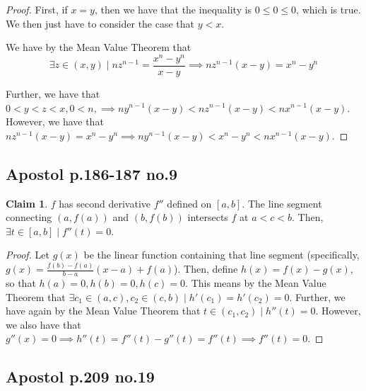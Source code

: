\documentclass[12pt,letterpaper]{article}
\theoremstyle{definition}
\newtheorem*{claim}{Claim}
\begin{document}
\begin{proof}

  First, if $x = y$, then we have that the inequality is $0 \leq 0 \leq 0$,
  which is true. We then just have to consider the case that $y < x$.
  
  We have by the Mean Value Theorem that
  \[
    \exists z \in (x,y) \mid nz^{n-1} = \frac{x^n - y^n}{x-y} \implies
    nz^{n-1}(x-y) = x^n-y^n
  \]

  Further, we have that $0 < y < z < x, 0 < n, \implies ny^{n-1}(x-y) <
  nz^{n-1}(x-y) < nx^{n-1}(x-y)$. However, we have that $nz^{n-1}(x-y) = x^n-y^n
  \implies ny^{n-1}(x-y) < x^n - y^n < nx^{n-1}(x-y)$.
\end{proof}

\subsection*{Apostol p.186-187 no.9}

\begin{claim}
  $f$ has second derivative $f''$ defined on $[a,b]$. The line segment
  connecting $(a,f(a))$ and $(b,f(b))$ intersects $f$ at $a < c < b$. Then,
  $\exists t \in [a,b] \mid f''(t) = 0$.
\end{claim}

\begin{proof}
  Let $g(x)$ be the linear function containing that line segment (specifically,
  $g(x) = \frac{f(b) - f(a)}{b-a}(x - a) + f(a)$). Then, define $h(x) =
  f(x) - g(x)$, so that $h(a) = 0, h(b) = 0, h(c) = 0$. This means by the Mean
  Value Theorem that $\exists c_1 \in (a,c), c_2 \in (c,b) \mid h'(c_1) =
  h'(c_2) = 0$. Further, we have again by the Mean Value Theorem that $t \in
  (c_1, c_2) \mid h''(t) = 0$. However, we also have that $g''(x) = 0 \implies
  h''(t) = f''(t) - g''(t) = f''(t) \implies f''(t) = 0$.
\end{proof}

\subsection*{Apostol p.209 no.19}
\end{document}
